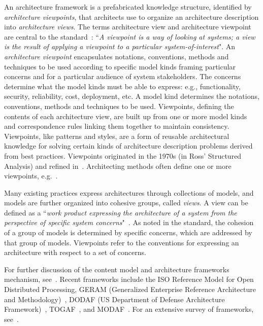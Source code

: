 An architecture framework is a prefabricated knowledge structure, identified by {\em architecture viewpoints}, that
architects use to organize an architecture description into {\em architecture views}.  The terms architecture view and architecture viewpoint are central to the standard~\cite{42010}:
``{\em A viewpoint is a way of looking at systems; a view is the result of applying a viewpoint to a particular
system-of-interest}". 
An {\em architecture viewpoint} encapsulates notations, conventions, methods and techniques to
be used according to specific 
model kinds framing particular
concerns and for a particular audience of system stakeholders. 
The
concerns determine what the model kinds must be able to express: e.g.,
functionality, security, reliability, cost, deployment, etc.  
A model
kind determines the notations, conventions, methods and techniques to
be used. 
Viewpoints, defining the contents of each architecture view,
are built up from one or more model kinds and correspondence rules
linking them together to maintain consistency.
Viewpoints, like patterns and styles, are a form of reusable
architectural knowledge for solving certain kinds of architecture
description problems derived from best practices.  
Viewpoints
originated in the 1970s (in Ross' Structured Analysis) and refined in~\cite{Finkelstein+92}. Architecting methods often define one or
more viewpoints, e.g.~\cite{4+1,RozWooBook,ClementsBachmannEtAl03, Eeles-Cripps:2010}.


Many existing practices express architectures through collections of
models, and models are further organized into cohesive groups, called {\em views}. A view can be defined as a ``{\em work product expressing the architecture of a system from the perspective of specific system concerns}"~\cite{42010}.
As noted in the standard, the cohesion of a
group of models is determined by specific concerns, which are addressed by that group of models. Viewpoints refer to the conventions
for expressing an architecture with respect to a set of concerns.

For further discussion of the
content model and architecture frameworks mechanism,
see~\cite{Emery-Hilliard:2009}. 
Recent
frameworks include the ISO Reference Model for Open Distributed
Processing, GERAM (Generalized Enterprise Reference Architecture
and Methodology)~\cite{ISO15704}, DODAF (US Department of Defense Architecture
Framework)~\cite{DODAF}, TOGAF~\cite{TOGAF}, and MODAF~\cite{MODAF}. 
For an extensive survey of
frameworks, see~\cite{AFS}. 
    


